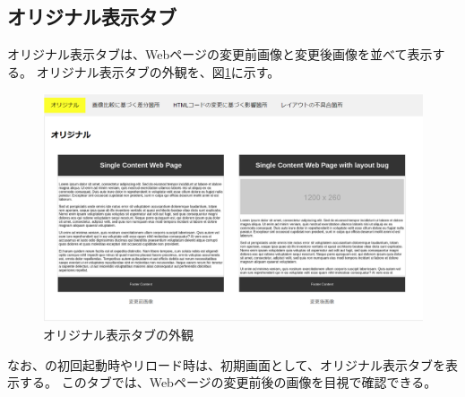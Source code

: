 \subsection{オリジナル表示タブ}\label{subsec:original_tab}
オリジナル表示タブは、Webページの変更前画像と変更後画像を並べて表示する。
オリジナル表示タブの外観を、図\ref{fig: Appearance_original_tab}に示す。
\begin{figure}[tp]
    \begin{center}
        \includegraphics[width=1.0\columnwidth]{image/3_original_tab2.png}
        \caption{オリジナル表示タブの外観}
        \label{fig: Appearance_original_tab}
    \end{center}
\end{figure}
なお、\toolName の初回起動時やリロード時は、初期画面として、オリジナル表示タブを表示する。
このタブでは、Webページの変更前後の画像を目視で確認できる。

